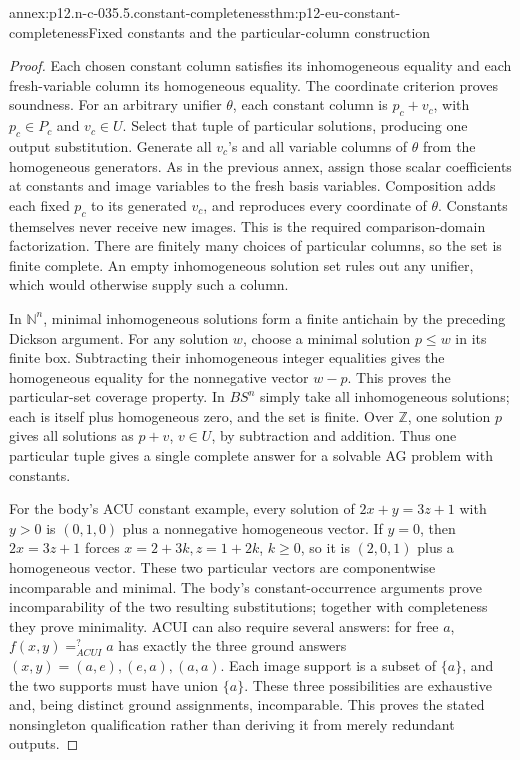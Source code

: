\begin{annexitem}{annex:p12.n-c-035.5.constant-completeness}{thm:p12-eu-constant-completeness}{Fixed constants and the particular-column construction}
\begin{proof}
Each chosen constant column satisfies its inhomogeneous equality and
each fresh-variable column its homogeneous equality. The coordinate
criterion proves soundness. For an arbitrary unifier \(\theta\),
each constant column is \(p_c+v_c\), with \(p_c\in P_c\) and
\(v_c\in U\). Select that tuple of particular solutions, producing
one output substitution. Generate all \(v_c\)'s and all variable
columns of \(\theta\) from the homogeneous generators. As in the
previous annex, assign those scalar coefficients at constants and image
variables to the fresh basis variables. Composition adds each fixed
\(p_c\) to its generated \(v_c\), and reproduces every coordinate
of \(\theta\). Constants themselves never receive new images.
This is the required comparison-domain factorization. There are finitely
many choices of particular columns, so the set is finite complete.
An empty inhomogeneous solution set rules out any unifier, which would
otherwise supply such a column.

In \(\mathbb N^n\), minimal inhomogeneous solutions form a finite
antichain by the preceding Dickson argument. For any solution \(w\),
choose a minimal solution \(p\leq w\) in its finite box. Subtracting
their inhomogeneous integer equalities gives the homogeneous equality
for the nonnegative vector \(w-p\). This proves the particular-set
coverage property. In \(BS^n\) simply take all inhomogeneous solutions;
each is itself plus homogeneous zero, and the set is finite.
Over \(\mathbb Z\), one solution \(p\) gives all solutions as
\(p+v\), \(v\in U\), by subtraction and addition. Thus one
particular tuple gives a single complete answer for a solvable AG
problem with constants.

For the body's ACU constant example, every solution of
\(2x+y=3z+1\) with \(y>0\) is \((0,1,0)\) plus a
nonnegative homogeneous vector. If \(y=0\), then
\(2x=3z+1\) forces \(x=2+3k,z=1+2k\), \(k\geq0\),
so it is \((2,0,1)\) plus a homogeneous vector. These two
particular vectors are componentwise incomparable and minimal.
The body's constant-occurrence arguments prove incomparability of the
two resulting substitutions; together with completeness they prove
minimality. ACUI can also require several answers: for free \(a\),
\(f(x,y)=^{?}_{ACUI}a\) has exactly the three ground answers
\((x,y)=(a,e),(e,a),(a,a)\). Each image support is a subset of
\(\{a\}\), and the two supports must have union \(\{a\}\).
These three possibilities are exhaustive and, being distinct ground
assignments, incomparable. This proves the stated nonsingleton
qualification rather than deriving it from merely redundant outputs.
\end{proof}
\end{annexitem}


